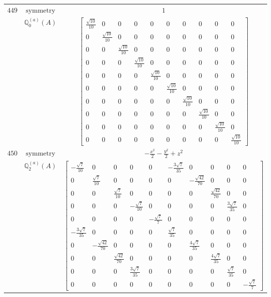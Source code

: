 \documentclass[fleqn,8pt,landscape]{jsarticle}
\begin{document}
\begin{longtable}{ccc}
$ 449 $ & $ \text{symmetry} $ & $ 1 $ \\
$  $ & $ \mathbb{Q}_{0}^{(a)}(A) $ & $ \begin{bmatrix} \frac{\sqrt{10}}{10} & 0 & 0 & 0 & 0 & 0 & 0 & 0 & 0 & 0 \\ 0 & \frac{\sqrt{10}}{10} & 0 & 0 & 0 & 0 & 0 & 0 & 0 & 0 \\ 0 & 0 & \frac{\sqrt{10}}{10} & 0 & 0 & 0 & 0 & 0 & 0 & 0 \\ 0 & 0 & 0 & \frac{\sqrt{10}}{10} & 0 & 0 & 0 & 0 & 0 & 0 \\ 0 & 0 & 0 & 0 & \frac{\sqrt{10}}{10} & 0 & 0 & 0 & 0 & 0 \\ 0 & 0 & 0 & 0 & 0 & \frac{\sqrt{10}}{10} & 0 & 0 & 0 & 0 \\ 0 & 0 & 0 & 0 & 0 & 0 & \frac{\sqrt{10}}{10} & 0 & 0 & 0 \\ 0 & 0 & 0 & 0 & 0 & 0 & 0 & \frac{\sqrt{10}}{10} & 0 & 0 \\ 0 & 0 & 0 & 0 & 0 & 0 & 0 & 0 & \frac{\sqrt{10}}{10} & 0 \\ 0 & 0 & 0 & 0 & 0 & 0 & 0 & 0 & 0 & \frac{\sqrt{10}}{10} \end{bmatrix} $ \\ \hline
$ 450 $ & $ \text{symmetry} $ & $ - \frac{x^{2}}{2} - \frac{y^{2}}{2} + z^{2} $ \\
$  $ & $ \mathbb{Q}_{2}^{(a)}(A) $ & $ \begin{bmatrix} - \frac{\sqrt{7}}{10} & 0 & 0 & 0 & 0 & - \frac{3 \sqrt{7}}{35} & 0 & 0 & 0 & 0 \\ 0 & \frac{\sqrt{7}}{10} & 0 & 0 & 0 & 0 & - \frac{\sqrt{42}}{70} & 0 & 0 & 0 \\ 0 & 0 & \frac{\sqrt{7}}{10} & 0 & 0 & 0 & 0 & \frac{\sqrt{42}}{70} & 0 & 0 \\ 0 & 0 & 0 & - \frac{\sqrt{7}}{10} & 0 & 0 & 0 & 0 & \frac{3 \sqrt{7}}{35} & 0 \\ 0 & 0 & 0 & 0 & - \frac{\sqrt{7}}{7} & 0 & 0 & 0 & 0 & 0 \\ - \frac{3 \sqrt{7}}{35} & 0 & 0 & 0 & 0 & \frac{\sqrt{7}}{35} & 0 & 0 & 0 & 0 \\ 0 & - \frac{\sqrt{42}}{70} & 0 & 0 & 0 & 0 & \frac{4 \sqrt{7}}{35} & 0 & 0 & 0 \\ 0 & 0 & \frac{\sqrt{42}}{70} & 0 & 0 & 0 & 0 & \frac{4 \sqrt{7}}{35} & 0 & 0 \\ 0 & 0 & 0 & \frac{3 \sqrt{7}}{35} & 0 & 0 & 0 & 0 & \frac{\sqrt{7}}{35} & 0 \\ 0 & 0 & 0 & 0 & 0 & 0 & 0 & 0 & 0 & - \frac{\sqrt{7}}{7} \end{bmatrix} $ \\ \hline

\end{longtable}
\end{document}
